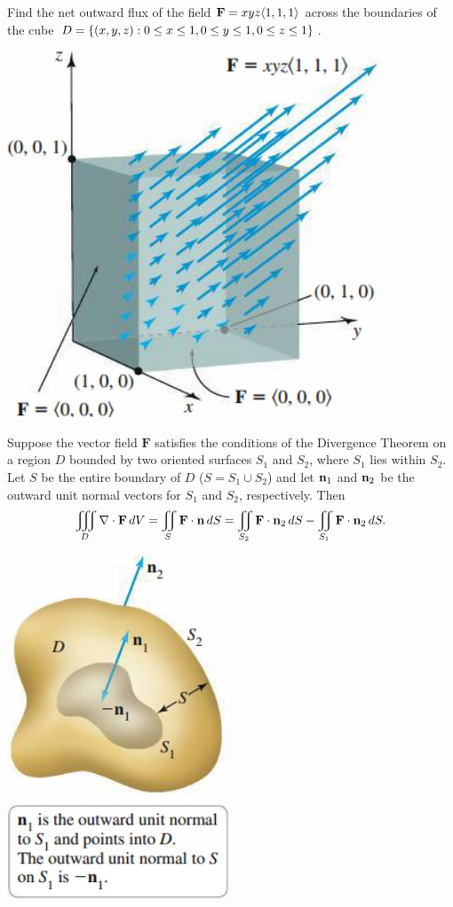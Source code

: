 \documentclass[mathNotesPreamble]{subfiles}
\begin{document}
  \begin{ex*}
    Find the net outward flux of the field $\mathbf F=xyz{\left\langle 1,1,1 \right\rangle}$ across the boundaries of the cube $D={\left\{(x,y,z): 0\leq x\leq 1, 0\leq y\leq 1, 0\leq z\leq 1\right\}}$.
  \end{ex*}
  \begin{flushright}
    \includegraphics[width=0.35\linewidth]{images/briggs_17_08/fig17_69}
  \end{flushright}
  \pagebreak

  \begin{thmBox*}
    Suppose the vector field $\mathbf F$ satisfies the conditions of the Divergence Theorem on a region $D$ bounded by two oriented surfaces $S_1$ and $S_2$, where $S_1$ lies within $S_2$. Let $S$ be the entire boundary of $D$ ($S=S_1\cup S_2$) and let ${\mathbf{n}}_1$ and ${\mathbf{n}}_2$ be the outward unit normal vectors for $S_1$ and $S_2$, respectively. Then
      \[\iiint\limits_D \nabla\cdot\mathbf F\,dV = \iint\limits_S \mathbf F\cdot{\mathbf{n}}\,dS = \iint\limits_{S_2} \mathbf F\cdot{\mathbf{n}}_2\,dS-\iint\limits_{S_1}\mathbf F\cdot{\mathbf{n}}_2\,dS.\]
  \end{thmBox*}
  \begin{center}
    \includegraphics[width=0.3\linewidth]{images/briggs_17_08/fig17_72}
  \end{center}
  \pagebreak
\end{document}
